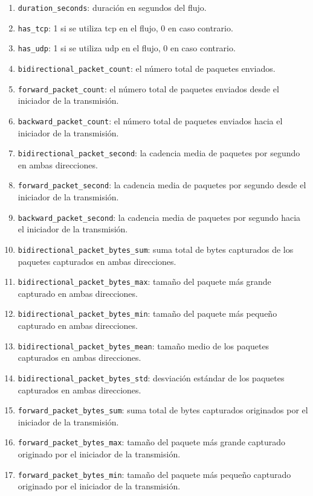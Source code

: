 \begin{enumerate}
  \item \texttt{duration\_seconds}: duración en segundos del flujo.
  \item \texttt{has\_tcp}: 1 si se utiliza \acrshort{tcp} en el flujo, 0 en caso contrario.
  \item \texttt{has\_udp}: 1 si se utiliza \acrshort{udp} en el flujo, 0 en caso contrario.
  \item \texttt{bidirectional\_packet\_count}: el número total de paquetes enviados.
  \item \texttt{forward\_packet\_count}: el número total de paquetes enviados desde el iniciador de la transmisión.
  \item \texttt{backward\_packet\_count}: el número total de paquetes enviados hacia el iniciador de la transmisión.
  \item \texttt{bidirectional\_packet\_second}: la cadencia media de paquetes por segundo en ambas direcciones.
  \item \texttt{forward\_packet\_second}: la cadencia media de paquetes por segundo desde el iniciador de la transmisión.
  \item \texttt{backward\_packet\_second}: la cadencia media de paquetes por segundo hacia el iniciador de la transmisión.
  \item \texttt{bidirectional\_packet\_bytes\_sum}: suma total de bytes capturados de los paquetes capturados en ambas direcciones.
  \item \texttt{bidirectional\_packet\_bytes\_max}: tamaño del paquete más grande capturado en ambas direcciones.
  \item \texttt{bidirectional\_packet\_bytes\_min}: tamaño del paquete más pequeño capturado en ambas direcciones.
  \item \texttt{bidirectional\_packet\_bytes\_mean}: tamaño medio de los paquetes capturados en ambas direcciones.
  \item \texttt{bidirectional\_packet\_bytes\_std}: desviación estándar de los paquetes capturados en ambas direcciones.
  \item \texttt{forward\_packet\_bytes\_sum}: suma total de bytes capturados originados por el iniciador de la transmisión.
  \item \texttt{forward\_packet\_bytes\_max}: tamaño del paquete más grande capturado originado por el iniciador de la transmisión.
  \item \texttt{forward\_packet\_bytes\_min}: tamaño del paquete más pequeño capturado originado por el iniciador de la transmisión.

\end{enumerate}
